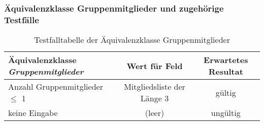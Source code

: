 \documentclass[ngerman,12pt,titlepage]{article}
\begin{document}
	\subsubsection{Äquivalenzklasse Gruppenmitglieder und zugehörige Testfälle}
		\begin{table}[H]
		\centering
		\begin{tabular}{l|c|c}
			\textbf{Äquivalenzklasse \textit{Gruppenmitglieder}} &\textbf{Wert für Feld}  &\textbf {Erwartetes Resultat} \\  
			\hline
			Anzahl Gruppenmitglieder \(\leq\) 1 & Mitgliedsliste der Länge 3 &gültig  \\  
			keine Eingabe &(leer)  & ungültig \\    
		\end{tabular}
		\caption{Testfalltabelle der Äquivalenzklasse Gruppenmitglieder}
	\end{table}
	\noindent
\end{document}

